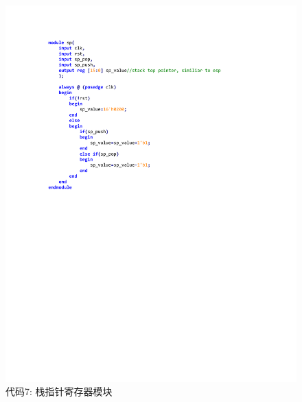 \documentclass[titlepage, 11pt]{article}
\begin{document}
			\begin{figure}[H]
				\centering
				\includegraphics[scale=1]{26.pdf}
				\caption*{代码7: 栈指针寄存器模块}
			\end{figure}
			
\end{document}
